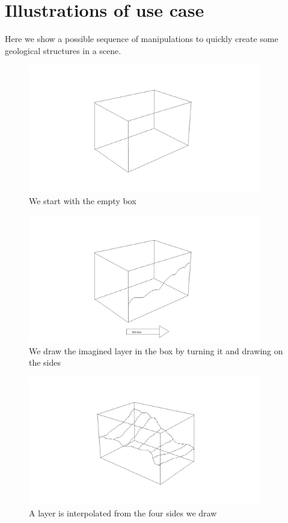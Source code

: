 \documentclass[12pt,a4paper]{article}
\begin{document}
\section*{Illustrations of use case}
Here we show a possible sequence of manipulations to  quickly create some geological structures in a scene.
\begin{figure}
\centering
\includegraphics[width=4in]{box}
\caption[]{
  \footnotesize
  We start with the empty box
  \label{fig:box}
}
\end{figure}

\begin{figure}
\centering
\includegraphics[width=4in]{turnBox}
\caption[]{
  \footnotesize
  We draw the imagined layer in the box by turning it and drawing on the sides
  \label{fig:turnBox}
}
\end{figure}

\begin{figure}
\centering
\includegraphics[width=4in]{interpolateLayer}
\caption[]{
  \footnotesize
  A layer is interpolated from the four sides we draw
  \label{fig:interpolateLayer}
}
\end{figure}
\end{document}
